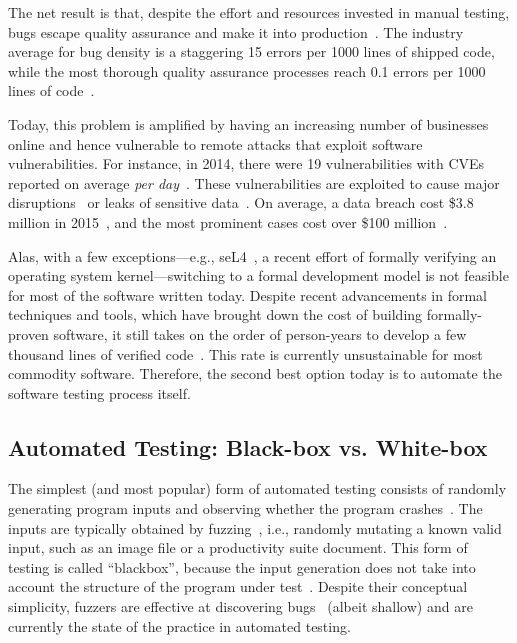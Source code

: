 The net result is that, despite the effort and resources invested in manual testing, bugs escape quality assurance and make it into production~\cite{redHatSecurityX}.
%
The industry average for bug density is a staggering 15 errors per 1000 lines of shipped code, while the most thorough quality assurance processes reach 0.1 errors per 1000 lines of code~\cite{codeComplete}.

Today, this problem is amplified by having an increasing number of businesses online and hence vulnerable to remote attacks that exploit software vulnerabilities.  For instance, in 2014, there were 19 vulnerabilities with CVEs reported on average \emph{per day}~\cite{nvd}.
%
These vulnerabilities are exploited to cause major disruptions~\cite{sony-hack} or leaks of sensitive data~\cite{sony-hack,psp-hack}.  On average, a data breach cost \$3.8 million in 2015~\cite{breach2015}, and the most prominent cases cost over \$100 million~\cite{target-hack}.

Alas, with a few exceptions---e.g., seL4~\cite{seL4}, a recent effort of formally verifying an operating system kernel---switching to a formal development model is not feasible for most of the software written today.
%
Despite recent advancements in formal techniques and tools, which have brought down the cost of building formally-proven software, it still takes on the order of person-years to develop a few thousand lines of verified code~\cite{seL4}.
%
This rate is currently unsustainable for most commodity software.
%
Therefore, the second best option today is to automate the software testing process itself.


\subsection{Automated Testing: Black-box vs. White-box}

The simplest (and most popular) form of automated testing consists of randomly generating program inputs and observing whether the program crashes~\cite{fuzz,quickcheck,afl,autodafe,skipfish}.
%
The inputs are typically obtained by fuzzing~\cite{fuzz}, i.e., randomly mutating a known valid input, such as an image file or a productivity suite document.  This form of testing is called ``blackbox'', because the input generation does not take into account the structure of the program under test~\cite{blackbox-testing}.
%
Despite their conceptual simplicity, fuzzers are effective at discovering  bugs~\cite{afl,autodafe,skipfish} (albeit shallow) and are currently the state of the practice in automated testing.

